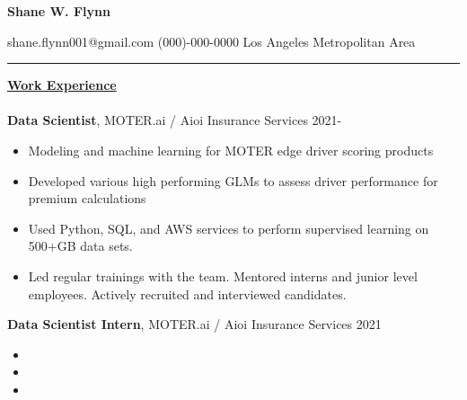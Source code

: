 \documentclass[letterpaper]{article}
\def\name{Shane W. Flynn}
\begin{document}
\centerline{\huge \textbf{\name}}
\vspace{0.1in}
shane.flynn001@gmail.com \hfill (000)-000-0000
\hfill Los Angeles Metropolitan Area
\hrule
\vspace{0.15in}
{\large \textbf{\underline{Work Experience}}}\\
\vspace{-0.2in}\\

\textbf{Data Scientist}, MOTER.ai / Aioi Insurance Services \hfill 2021-
\vspace{-.2in}\\
\begin{itemize}
  \item Modeling and machine learning for MOTER edge driver scoring products
  \vspace{-.1in}
  \item Developed various high performing GLMs to assess driver performance for
  premium calculations
  \vspace{-.1in}
  \item Used Python, SQL, and AWS services to perform supervised learning on
  \vspace{-.1in}
  500+GB data sets.
  \item Led regular trainings with the team. Mentored interns and junior level employees. Actively recruited and interviewed candidates.
\end{itemize}

\textbf{Data Scientist Intern}, MOTER.ai / Aioi Insurance Services \hfill 2021
\vspace{-0.2in}\\
\begin{itemize}
  \item
  \vspace{-.1in}
  \item
  \vspace{-.1in}
  \item
\end{itemize}
\end{document}
